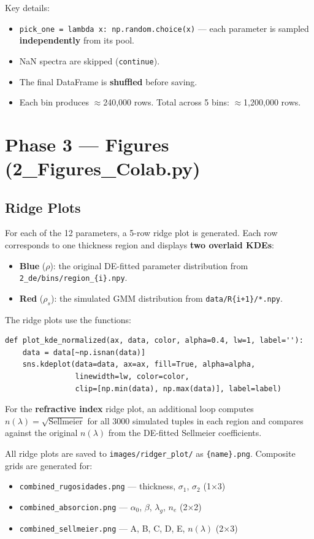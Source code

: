 \documentclass[11pt,a4paper]{article}
\begin{document}
Key details:
\begin{itemize}
    \item {\tt pick\_one = lambda x: np.random.choice(x)} — each parameter is sampled \textbf{independently} from its pool.
    \item NaN spectra are skipped ({\tt continue}).
    \item The final DataFrame is \textbf{shuffled} before saving.
    \item Each bin produces $\approx$240,000 rows. Total across 5 bins: $\approx$1,200,000 rows.
\end{itemize}

\section{Phase 3 — Figures (2\_Figures\_Colab.py)}

\subsection{Ridge Plots}

For each of the 12 parameters, a 5-row ridge plot is generated. Each row corresponds to one thickness region and displays \textbf{two overlaid KDEs}:

\begin{itemize}
    \item \textbf{Blue} ($\rho$): the original DE-fitted parameter distribution from {\tt 2\_de/bins/region\_\{i\}.npy}.
    \item \textbf{Red} ($\rho_s$): the simulated GMM distribution from {\tt data/R\{i+1\}/*.npy}.
\end{itemize}

The ridge plots use the functions:
\begin{lstlisting}
def plot_kde_normalized(ax, data, color, alpha=0.4, lw=1, label=''):
    data = data[~np.isnan(data)]
    sns.kdeplot(data=data, ax=ax, fill=True, alpha=alpha,
                linewidth=lw, color=color,
                clip=[np.min(data), np.max(data)], label=label)
\end{lstlisting}

For the \textbf{refractive index} ridge plot, an additional loop computes $n(\lambda) = \sqrt{\text{Sellmeier}}$ for all 3000 simulated tuples in each region and compares against the original $n(\lambda)$ from the DE-fitted Sellmeier coefficients.

All ridge plots are saved to {\tt images/ridger\_plot/} as {\tt \{name\}.png}. Composite grids are generated for:
\begin{itemize}
    \item {\tt combined\_rugosidades.png} — thickness, $\sigma_1$, $\sigma_2$ (1×3)
    \item {\tt combined\_absorcion.png} — $\alpha_0$, $\beta$, $\lambda_g$, $n_e$ (2×2)
    \item {\tt combined\_sellmeier.png} — A, B, C, D, E, $n(\lambda)$ (2×3)
\end{itemize}
\end{document}
